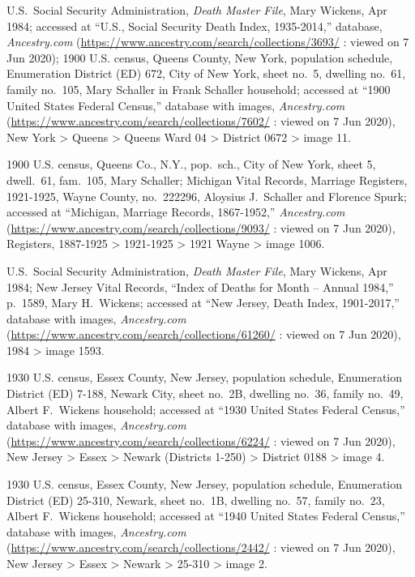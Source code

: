 \begin{thebibliography}{999}
U.S.\ Social Security Administration, \textit{Death Master File}, Mary Wickens, Apr 1984; accessed at ``U.S., Social Security Death Index, 1935-2014,'' database, \textit{Ancestry.com} (\url{https://www.ancestry.com/search/collections/3693/} : viewed on 7 Jun 2020); 1900 U.S. census, Queens County, New York, population schedule, Enumeration District (ED) 672, City of New York, sheet no.\ 5, dwelling no.\ 61, family no.\ 105, Mary Schaller in Frank Schaller household; accessed at ``1900 United States Federal Census,'' database with images, \textit{Ancestry.com} (\url{https://www.ancestry.com/search/collections/7602/} : viewed on 7 Jun 2020), New York > Queens > Queens Ward 04 > District 0672 > image 11.

1900 U.S. census, Queens Co., N.Y., pop.\ sch., City of New York, sheet 5, dwell.\ 61, fam.\ 105, Mary Schaller; Michigan Vital Records, Marriage Registers, 1921-1925, Wayne County, no.\ 222296, Aloysius J.\ Schaller and Florence Spurk; accessed at ``Michigan, Marriage Records, 1867-1952,'' \textit{Ancestry.com} (\url{https://www.ancestry.com/search/collections/9093/} : viewed on 7 Jun 2020), Registers, 1887-1925 > 1921-1925 > 1921 Wayne > image 1006.

U.S.\ Social Security Administration, \textit{Death Master File}, Mary Wickens, Apr 1984; New Jersey Vital Records, ``Index of Deaths for Month -- Annual 1984,'' p.\ 1589, Mary H.\ Wickens; accessed at ``New Jersey, Death Index, 1901-2017,'' database with images, \textit{Ancestry.com} (\url{https://www.ancestry.com/search/collections/61260/} : viewed on 7 Jun 2020), 1984 > image 1593.

1930 U.S. census, Essex County, New Jersey, population schedule, Enumeration District (ED) 7-188, Newark City, sheet no.\ 2B, dwelling no.\ 36, family no.\ 49, Albert F.\ Wickens household; accessed at ``1930 United States Federal Census,'' database with images, \textit{Ancestry.com} (\url{https://www.ancestry.com/search/collections/6224/} : viewed on 7 Jun 2020), New Jersey > Essex > Newark (Districts 1-250) > District 0188 > image 4.

1930 U.S. census, Essex County, New Jersey, population schedule, Enumeration District (ED) 25-310, Newark, sheet no.\ 1B, dwelling no.\ 57, family no.\ 23, Albert F.\ Wickens household; accessed at ``1940 United States Federal Census,'' database with images, \textit{Ancestry.com} (\url{https://www.ancestry.com/search/collections/2442/} : viewed on 7 Jun 2020), New Jersey > Essex > Newark > 25-310 > image 2.


\end{thebibliography}
